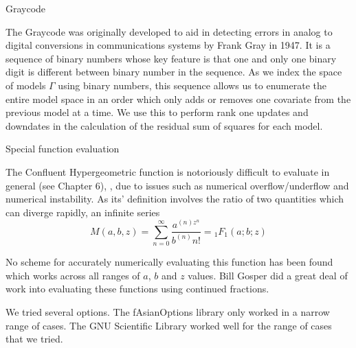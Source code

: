\documentclass{amsart}
\begin{document}
Graycode

The Graycode was originally developed to aid in detecting errors in analog to digital conversions in
communications systems by Frank Gray in 1947. It is a sequence of binary numbers whose key feature is that
one and only one binary digit is different between binary number in the sequence. As we index the space of
models $\Gamma$ using binary numbers, this sequence allows us to enumerate the entire model space in an order
which only adds or removes one covariate from the previous model at a time. We use this to perform rank
one updates and downdates in the calculation of the residual sum of squares for each model.

Special function evaluation

The Confluent Hypergeometric function is notoriously difficult to evaluate in general (see
\cite{Press:2007:NRE:1403886} Chapter 6), , due to issues such as numerical overflow/underflow and numerical
instability. As its' definition involves the ratio of two quantities which can diverge rapidly, an infinite
series
\[
	M(a, b, z) = \sum_{n=0}^\infty \frac{a^{(n) z^n}}{b^{(n)} n!} = {_1} F_1(a; b; z)
\]

No scheme for accurately numerically evaluating this function has been found which works across all ranges of
$a$, $b$ and $z$ values. Bill Gosper did a great deal of work into evaluating these functions using continued
fractions.

We tried several options. The fAsianOptions library only worked in a narrow range of cases. The GNU Scientific
Library worked well for the range of cases that we tried.



\end{document}
